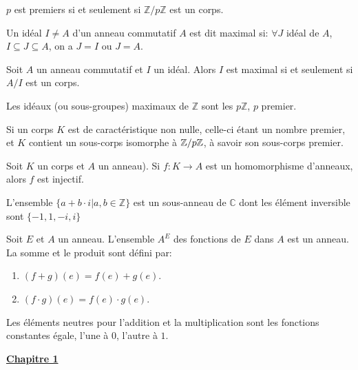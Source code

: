 \documentclass[12pt,a4paper]{article}
\begin{document}
\begin{flushleft}
\begin{prop}
$p$ est premiers si et seulement si $\mathbb{Z}/ p \mathbb{Z}$ est un corps.
\end{prop}

\begin{mydef}
Un idéal $I \neq A$ d'un anneau commutatif $A$ est dit maximal si:
$\forall J$ idéal de $A$, $I \subseteq J \subseteq A$, on a $J = I$ ou $J = A$.
\end{mydef}

\begin{prop}
Soit $A$ un anneau commutatif et $I$ un idéal. Alors $I$ est maximal si et seulement si $A/I$ est un corps.
\end{prop}

\begin{cor}
Les idéaux (ou sous-groupes) maximaux de $\mathbb{Z}$ sont les $p \mathbb{Z}$, $p$ premier.
\end{cor}

\begin{prop}
Si un corps $K$ est de caractéristique non nulle, celle-ci étant un nombre premier, et $K$ contient un sous-corps isomorphe à $\mathbb{Z} / p \mathbb{Z}$, à savoir son sous-corps premier.
\end{prop}

\begin{prop}
Soit $K$ un corps et $A$ un anneau). Si $f: K \rightarrow A$ est un homomorphisme d'anneaux, alors $f$ est injectif.
\end{prop}

\begin{prop}
L'ensemble $\{ a + b \cdot i| a, b \in \mathbb{Z} \} $ est un sous-anneau de $\mathbb{C}$ dont les élément inversible sont $\{-1, 1, -i, i \}$
\end{prop}

\begin{prop}
Soit $E$ et $A$ un anneau. L'ensemble $A^E$ des fonctions de $E$ dans $A$ est un anneau. La somme et le produit sont défini par: 
\begin{enumerate}
\item $(f+g)(e)= f(e) + g(e)$.
\item $(f \cdot g) (e) = f(e) \cdot g(e)$.
\end{enumerate}
Les éléments neutres pour l'addition et la multiplication sont les fonctions constantes égale, l'une à $0$, l'autre à $1$. 
\end{prop}


\textbf{\underline{Chapitre 1}}\\~\\


\end{flushleft}
\end{document}
